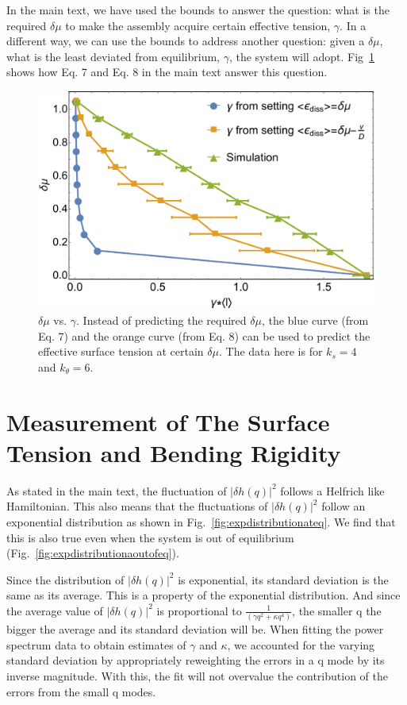 \documentclass[amsmath,preprintnumbers,10pt,nofootinbib,prl,twocolumn]{revtex4-1}
\begin{document}
In the main text, we have used the bounds to answer the question: what is the required $\delta\mu$ to make the assembly acquire certain effective tension, $\gamma$. In a different way, we can use the bounds to address another question: given a $\delta\mu$, what is the least deviated from equilibrium, $\gamma$, the system will adopt. Fig~\ref{fig:epsilonpredict} shows how Eq. 7 and Eq. 8 in the main text answer this question.
\begin{figure}[tbb]
\centering
\includegraphics[scale=0.27]{Fig4.pdf}
\caption{$\delta\mu$ vs. $\gamma$. Instead of predicting the required $\delta\mu$, the blue curve (from Eq. 7) and the orange curve (from Eq. 8) can be used to predict the effective surface tension at certain $\delta \mu$. The data here is for $k_s=4$ and $k_\theta = 6$.} \label{fig:epsilonpredict}
\end{figure}


\section{Measurement of The Surface Tension and Bending Rigidity}

As stated in the main text, the fluctuation of $|\delta h(q)|^2$ follows  a Helfrich like Hamiltonian. This also means that the fluctuations of $|\delta h(q)|^2$ follow an exponential distribution as shown in Fig.~\ref{fig:expdistributionateq}. We find that this is also true even when the system is out of equilibrium (Fig.~\ref{fig:expdistributionaoutofeq}).

Since the distribution of $|\delta h(q)|^2$ is exponential, its standard deviation is the same as its average. This is a property of the exponential distribution. And since the average value of $|\delta h(q)|^2$ is proportional to $\frac{1}{(\gamma q^2+\kappa q^4)}$, the smaller q the bigger the average and its standard deviation will be. When fitting the power spectrum data to obtain estimates of $\gamma$ and $\kappa$, we accounted for the varying standard deviation by appropriately reweighting the errors in a q mode by its inverse magnitude. With this, the fit will not overvalue the contribution of the errors from the small q modes.
 
\end{document}
